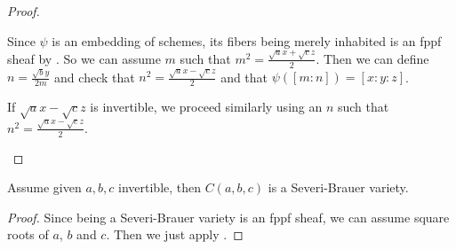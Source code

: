 \begin{proof}
\begin{itemize}
Since $\psi$ is an embedding of schemes, its fibers being merely inhabited is an fppf sheaf by . So we can assume $m$ such that $m^2 = \frac{\sqrt{a}x+\sqrt{c}z}{2}$. Then we can define $n=\frac{\sqrt{b}y}{2m}$ and check that $n^2 = \frac{\sqrt{a}x-\sqrt{c}z}{2}$ and that $\psi([m:n]) = [x:y:z]$. 

If $\sqrt{a}x-\sqrt{c}z$ is invertible, we proceed similarly using an $n$ such that $n^2=\frac{\sqrt{a}x-\sqrt{c}z}{2}$.
\end{itemize}
\end{proof}

\begin{lemma}
Assume given $a,b,c$ invertible, then $C(a,b,c)$ is a Severi-Brauer variety.
\end{lemma}

\begin{proof}
Since being a Severi-Brauer variety is an fppf sheaf, we can assume square roots of $a$, $b$ and $c$. Then we just apply .
\end{proof}